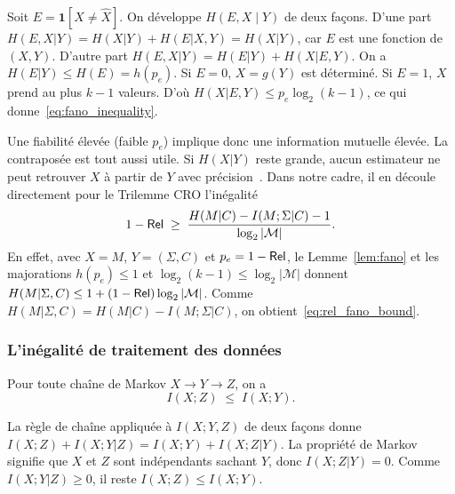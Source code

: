 \begin{sloppypar}
\begin{Preuve}
Soit $E = \mathbf{1}[X \neq \hat X]$. On d\'eveloppe $H(E, X \mid Y)$ de deux fa\c{c}ons.
D'une part $H(E,X|Y) = H(X|Y) + H(E|X,Y) = H(X|Y)$, car $E$ est une fonction de
$(X,Y)$. D'autre part $H(E,X|Y) = H(E|Y) + H(X|E,Y)$. On a $H(E|Y) \leq H(E) = h(p_e)$.
Si $E = 0$, $X = g(Y)$ est d\'etermin\'e. Si $E = 1$, $X$ prend au plus $k-1$
valeurs. D'o\`u $H(X|E,Y) \leq p_e\log_2(k-1)$, ce qui donne~\eqref{eq:fano_inequality}.
\end{Preuve}

Une fiabilit\'e \'elev\'ee (faible $p_e$) implique donc une information mutuelle \'elev\'ee.
La contrapos\'ee est tout aussi utile. Si $H(X|Y)$ reste grande, aucun
estimateur ne peut retrouver $X$ \`a partir de $Y$ avec pr\'ecision~\cite{HanVerdu}. Dans notre
cadre, il en d\'ecoule directement pour le Trilemme CRO l'in\'egalit\'e
\begin{equation}
1 - \mathsf{Rel} \;\geq\; \frac{H(M|C) - I(M;\Sigma|C) - 1}{\log_2 |\mathcal{M}|}.
\label{eq:rel_fano_bound}
\end{equation}
En effet, avec $X = M$, $Y = (\Sigma,C)$ et $p_e = 1 - \mathsf{Rel}$, le Lemme~\ref{lem:fano}
et les majorations $h(p_e) \leq 1$ et $\log_2(k-1) \leq \log_2|\mathcal{M}|$ donnent
$H(M|\Sigma,C) \leq 1 + (1-\mathsf{Rel})\log_2|\mathcal{M}|$. Comme
$H(M|\Sigma,C) = H(M|C) - I(M;\Sigma|C)$, on obtient~\eqref{eq:rel_fano_bound}.

\subsubsection{L'in\'egalit\'e de traitement des donn\'ees}
\label{subsubsec:dpi}

\begin{lemma}\label{lem:dpi}
Pour toute cha\^ine de Markov $X \to Y \to Z$, on a
\begin{equation}
I(X;Z) \;\leq\; I(X;Y).
\label{eq:dpi}
\end{equation}
\end{lemma}

\begin{Preuve}
La r\`egle de cha\^ine appliqu\'ee \`a $I(X;Y,Z)$ de deux fa\c{c}ons donne
$I(X;Z) + I(X;Y|Z) = I(X;Y) + I(X;Z|Y)$. La propri\'et\'e de Markov signifie que
$X$ et $Z$ sont ind\'ependants sachant $Y$, donc $I(X;Z|Y) = 0$. Comme
$I(X;Y|Z) \geq 0$, il reste $I(X;Z) \leq I(X;Y)$.
\end{Preuve}


\end{sloppypar}
